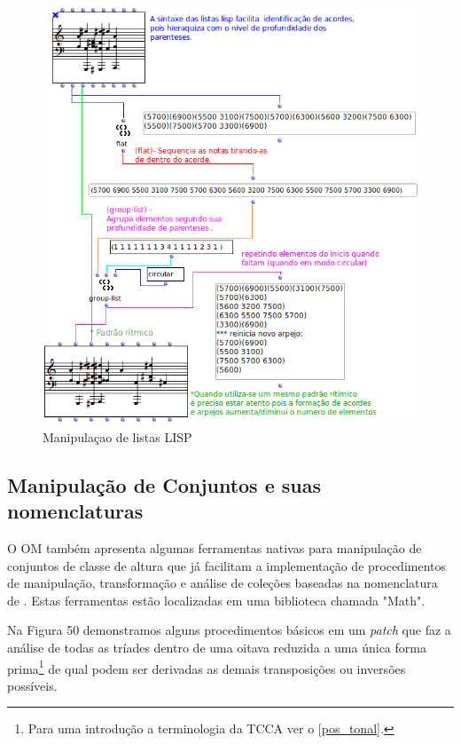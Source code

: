 \documentclass[
	12pt,				%
	openright,			%
	twoside,			%
	a4paper,			%
	english,			%
	french,				%
	spanish,			%
	brazil				%
	]{abntex2}
\begin{document}
\begin{figure}[!h]
	\caption{\label{fig_grafico}Manipulaçao de listas LISP }
	\begin{center}
	    \includegraphics[scale=0.6]{OMPD/manipulacao02.png}
	\end{center}
\end{figure}

\pagebreak
\subsection{Manipulação de Conjuntos e suas nomenclaturas}

O OM também apresenta algumas ferramentas nativas para manipulação de conjuntos de classe de altura que já facilitam a implementação de procedimentos de manipulação, transformação e análise de coleções baseadas na nomenclatura de . Estas ferramentas estão localizadas em uma biblioteca chamada "Math".

Na Figura 50 demonstramos alguns procedimentos básicos em um \textit{patch} que faz a análise de todas as tríades dentro de uma oitava reduzida a uma única forma prima\footnote{Para uma introdução a terminologia da TCCA ver o \autoref{pos_tonal}. } de qual podem ser derivadas as demais transposições ou inversões possíveis.
\end{document}
